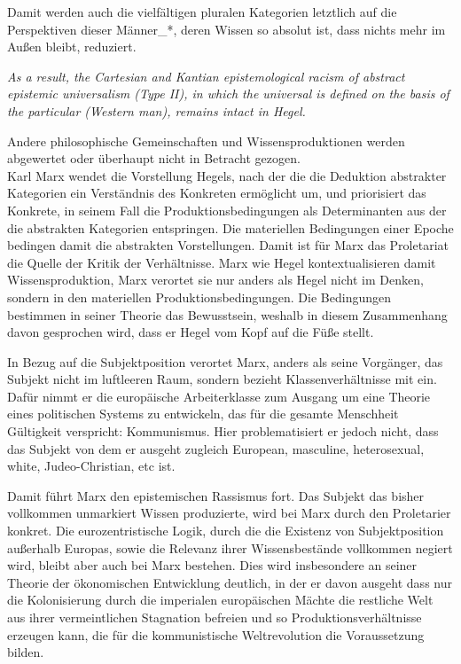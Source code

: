 Damit werden auch die vielfältigen pluralen Kategorien letztlich auf die
Perspektiven dieser Männer\_*, deren Wissen so absolut ist, dass nichts mehr im
Außen bleibt, reduziert.
  
\begin{myenv} 
  \textit{\glqq As a result, the Cartesian and Kantian
  epistemological racism of abstract epistemic universalism (Type II), in which
the universal is defined on the basis of the particular (Western man), remains
intact in Hegel.\grqq \footnotemark {} }
\end{myenv}

Andere philosophische Gemeinschaften und Wissensproduktionen werden abgewertet oder überhaupt nicht in Betracht gezogen.
\\

Karl Marx wendet die Vorstellung Hegels, nach der die die Deduktion abstrakter
Kategorien ein Verständnis des Konkreten ermöglicht um, und priorisiert das
Konkrete, in seinem Fall die Produktionsbedingungen als Determinanten aus der
die abstrakten Kategorien entspringen.\footnotemark {} Die materiellen Bedingungen einer
Epoche bedingen damit die abstrakten Vorstellungen. Damit ist für Marx das
Proletariat die Quelle der Kritik der Verhältnisse. Marx wie Hegel
kontextualisieren damit Wissensproduktion, Marx verortet sie nur anders als
Hegel nicht im Denken, sondern in den materiellen Produktionsbedingungen. Die
Bedingungen bestimmen in seiner Theorie das Bewusstsein, weshalb in diesem
Zusammenhang davon gesprochen wird, dass er Hegel vom Kopf auf die Füße stellt.

In Bezug auf die Subjektposition verortet Marx, anders als seine Vorgänger, das
Subjekt nicht im luftleeren Raum, sondern bezieht Klassenverhältnisse mit ein.
Dafür nimmt er die europäische Arbeiterklasse zum Ausgang um eine Theorie eines
politischen Systems zu entwickeln, das für die gesamte Menschheit Gültigkeit
verspricht: Kommunismus. Hier problematisiert er jedoch nicht, dass das Subjekt
von dem er ausgeht zugleich  \glqq European, masculine, heterosexual, white,
Judeo-Christian, etc \grqq \footnotemark {} ist.

Damit führt Marx den epistemischen Rassismus fort. Das Subjekt das bisher
vollkommen unmarkiert Wissen produzierte, wird bei Marx durch den Proletarier
konkret. Die eurozentristische Logik, durch die die Existenz von
Subjektposition außerhalb Europas, sowie die Relevanz ihrer Wissensbestände
vollkommen negiert wird, bleibt aber auch bei Marx bestehen.\footnotemark {}  Dies wird
insbesondere an seiner Theorie der ökonomischen Entwicklung deutlich, in der er
davon ausgeht dass nur die Kolonisierung durch die imperialen europäischen
Mächte die restliche Welt aus ihrer vermeintlichen Stagnation befreien und so
Produktionsverhältnisse erzeugen kann, die für die kommunistische
Weltrevolution die Voraussetzung bilden.
\\

